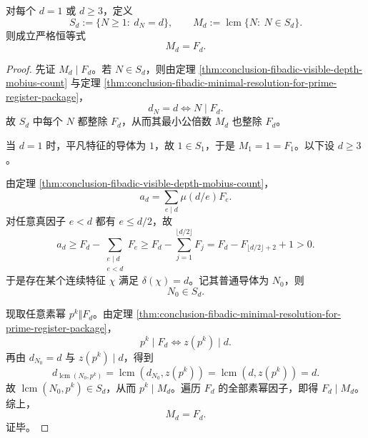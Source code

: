 \begin{theorem}[精确深度的导体饱和]\label{thm:conclusion-fibadic-exact-depth-conductor-saturation}
对每个 \(d=1\) 或 \(d\ge 3\)，定义
\[
S_d:=\{N\ge 1:\ d_N=d\},
\qquad
M_d:=\operatorname{lcm}\{N:\ N\in S_d\}.
\]
则成立严格恒等式
\[
M_d=F_d.
\]
\end{theorem}
\begin{proof}
先证 \(M_d\mid F_d\)。若 \(N\in S_d\)，则由定理
\ref{thm:conclusion-fibadic-visible-depth-mobius-count} 与定理
\ref{thm:conclusion-fibadic-minimal-resolution-for-prime-register-package}，
\[
d_N=d
\iff
N\mid F_d.
\]
故 \(S_d\) 中每个 \(N\) 都整除 \(F_d\)，从而其最小公倍数 \(M_d\) 也整除 \(F_d\)。

当 \(d=1\) 时，平凡特征的导体为 \(1\)，故 \(1\in S_1\)，于是 \(M_1=1=F_1\)。以下设 \(d\ge 3\)。

由定理 \ref{thm:conclusion-fibadic-visible-depth-mobius-count}，
\[
a_d=\sum_{e\mid d}\mu(d/e)F_e.
\]
对任意真因子 \(e<d\) 都有 \(e\le d/2\)，故
\[
a_d
\ge
F_d-\sum_{\substack{e\mid d\\ e<d}}F_e
\ge
F_d-\sum_{j=1}^{\lfloor d/2\rfloor}F_j
=
F_d-F_{\lfloor d/2\rfloor+2}+1
>0.
\]
于是存在某个连续特征 \(\chi\) 满足 \(\delta(\chi)=d\)。记其普通导体为 \(N_0\)，则
\[
N_0\in S_d.
\]

现取任意素幂 \(p^k\Vert F_d\)。由定理
\ref{thm:conclusion-fibadic-minimal-resolution-for-prime-register-package}，
\[
p^k\mid F_d
\iff
z(p^k)\mid d.
\]
再由 \(d_{N_0}=d\) 与 \(z(p^k)\mid d\)，得到
\[
d_{\operatorname{lcm}(N_0,p^k)}
=
\operatorname{lcm}(d_{N_0},z(p^k))
=
\operatorname{lcm}(d,z(p^k))
=
d.
\]
故 \(\operatorname{lcm}(N_0,p^k)\in S_d\)，从而 \(p^k\mid M_d\)。遍历 \(F_d\) 的全部素幂因子，即得 \(F_d\mid M_d\)。综上，
\[
M_d=F_d.
\]
证毕。
\end{proof}

